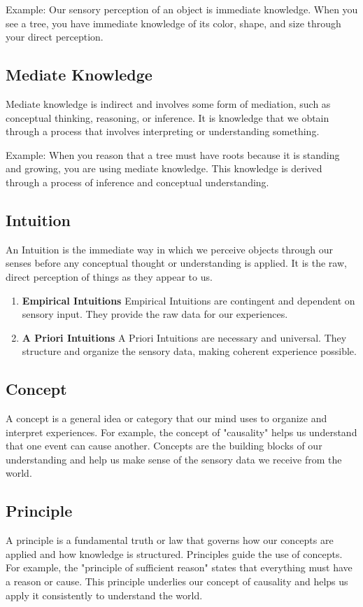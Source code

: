 \documentclass[a4paper]{article}
\begin{document}
Example: Our sensory perception of an object is immediate knowledge. 
When you see a tree, you have immediate knowledge of its color, shape, and size through your direct perception.

\subsection{Mediate Knowledge}
Mediate knowledge is indirect and involves some form of mediation, such as conceptual thinking, reasoning, or inference. 
It is knowledge that we obtain through a process that involves interpreting or understanding something.

Example: When you reason that a tree must have roots because it is standing and growing, you are using mediate knowledge. This knowledge is derived through a process of inference and conceptual understanding.

\subsection{Intuition}
An Intuition is the immediate way in which we perceive objects through our senses before any conceptual thought or understanding is applied. 
It is the raw, direct perception of things as they appear to us.

\begin{enumerate}
    \item \textbf{Empirical Intuitions} Empirical Intuitions are contingent and dependent on sensory input. They provide the raw data for our experiences.
    \item \textbf{A Priori Intuitions} A Priori Intuitions are necessary and universal. They structure and organize the sensory data, making coherent experience possible.
\end{enumerate}


\subsection{Concept}
A concept is a general idea or category that our mind uses to organize and interpret experiences. 
For example, the concept of "causality" helps us understand that one event can cause another. 
Concepts are the building blocks of our understanding and help us make sense of the sensory data we receive from the world.

\subsection{Principle}
A principle is a fundamental truth or law that governs how our concepts are applied and how knowledge is structured. 
Principles guide the use of concepts. 
For example, the "principle of sufficient reason" states that everything must have a reason or cause. 
This principle underlies our concept of causality and helps us apply it consistently to understand the world.
\end{document}
